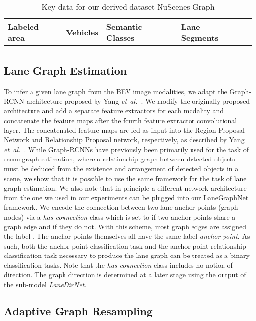 \documentclass[letterpaper, 10 pt, conference]{ieeeconf}
\newcommand{\etal}{\emph{et~al.~}}
\begin{document}
\begin{table}
\centering
\caption{Key data for our derived dataset NuScenes Graph}
\label{tab:dataset-details}
\begin{tabular}{p{1.5cm}p{1cm}p{1cm}p{1.5cm}p{2cm}}
Labeled area  & Vehicles  & Semantic Classes & Lane Segments  \\
 \hline
 &  &   &   \\
\end{tabular}
\end{table}




\subsection{Lane Graph Estimation}


To infer a given lane graph from the BEV image modalities, we adapt the Graph-RCNN architecture proposed by Yang \etal \cite{yang2018graph}. We modify the originally proposed architecture and add a separate feature extractors for each modality and concatenate the feature maps after the fourth feature extractor convolutional layer. The concatenated feature maps are fed as input into the Region Proposal Network and Relationship Proposal network, respectively, as described by Yang \etal \cite{yang2018graph}. While Graph-RCNNs have previously been primarily used for the task of scene graph estimation, where a relationship graph between detected objects must be deduced from the existence and arrangement of detected objects in a scene, we show that it is possible to use the same framework for the task of lane graph estimation. We also note that in principle a different network architecture from the one we used in our experiments can be plugged into our LaneGraphNet framework. We encode the connection between two lane anchor points (graph nodes) via a \textit{has-connection}-class which is set to  if two anchor points share a graph edge and  if they do not. With this scheme, most graph edges are assigned the label . The anchor points themselves all have the same label \textit{anchor-point}. As such, both the anchor point classification task and the anchor point relationship classification task necessary to produce the lane graph can be treated as a binary classification tasks. Note that the \textit{has-connection}-class includes no notion of direction. The graph direction is determined at a later stage using the output of the sub-model \textit{LaneDirNet}.


\subsection{Adaptive Graph Resampling}
\end{document}
